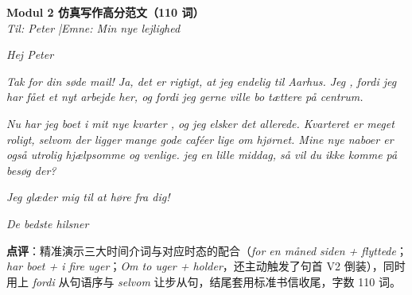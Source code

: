 \begin{answerbox}
\textbf{Modul 2 仿真写作高分范文（110 词）}\\
\textit{Til: Peter \quad|\quad Emne: Min nye lejlighed}

\textit{Hej Peter}

\textit{Tak for din søde mail! Ja, det er rigtigt, at jeg endelig  til Aarhus. Jeg  , fordi jeg har fået et nyt arbejde her, og fordi jeg gerne ville bo tættere på centrum.}

\textit{Nu har jeg boet i mit nye kvarter , og jeg elsker det allerede. Kvarteret er meget roligt, selvom der ligger mange gode caféer lige om hjørnet. Mine nye naboer er også utrolig hjælpsomme og venlige.   jeg en lille middag, så vil du ikke komme på besøg der?}

\textit{Jeg glæder mig til at høre fra dig!}

\textit{De bedste hilsner\\
}

\small\textbf{点评}：精准演示三大时间介词与对应时态的配合（\textit{for en måned siden + flyttede}；\textit{har boet + i fire uger}；\textit{Om to uger + holder}，还主动触发了句首 V2 倒装），同时用上 \textit{fordi} 从句语序与 \textit{selvom} 让步从句，结尾套用标准书信收尾，字数 110 词。
\end{answerbox}
